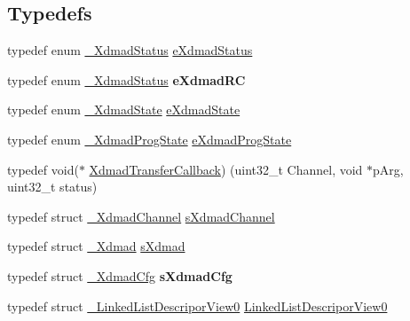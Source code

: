\subsection*{Typedefs}
\begin{DoxyCompactItemize}
\item 
typedef enum \mbox{\hyperlink{group__dmad__structs_gaec02ce64b667fbde91b1a90f4c61e3ca}{\+\_\+\+Xdmad\+Status}} \mbox{\hyperlink{group__dmad__structs_gae8f2d3dcc5f2bd3d05b76fd622eff70a}{e\+Xdmad\+Status}}
\item 
\mbox{\label{group__dmad__structs_ga843b6b8fc3ac9d6ce072d30c31ef07cd}} 
typedef enum \mbox{\hyperlink{group__dmad__structs_gaec02ce64b667fbde91b1a90f4c61e3ca}{\+\_\+\+Xdmad\+Status}} {\bfseries e\+Xdmad\+RC}
\item 
typedef enum \mbox{\hyperlink{group__dmad__structs_gab11875bdf8f31a2c76972640dcf13d89}{\+\_\+\+Xdmad\+State}} \mbox{\hyperlink{group__dmad__structs_ga82216e1cb5c7ed88c6e2d2e841a736fe}{e\+Xdmad\+State}}
\item 
typedef enum \mbox{\hyperlink{group__dmad__structs_gaea9ca6ac14cc448af9be1515bd2205c5}{\+\_\+\+Xdmad\+Prog\+State}} \mbox{\hyperlink{group__dmad__structs_gae5f8d9cd578ec745f050ebe575bc5753}{e\+Xdmad\+Prog\+State}}
\item 
typedef void($\ast$ \mbox{\hyperlink{group__dmad__structs_gaa36d3490b9c6967852605416acf658be}{Xdmad\+Transfer\+Callback}}) (uint32\+\_\+t Channel, void $\ast$p\+Arg, uint32\+\_\+t status)
\item 
typedef struct \mbox{\hyperlink{struct__XdmadChannel}{\+\_\+\+Xdmad\+Channel}} \mbox{\hyperlink{group__dmad__structs_ga822ea5147816d44b556f989a365c54b2}{s\+Xdmad\+Channel}}
\item 
typedef struct \mbox{\hyperlink{struct__Xdmad}{\+\_\+\+Xdmad}} \mbox{\hyperlink{group__dmad__structs_gaf2c13151514615a6beb35c0d868a5053}{s\+Xdmad}}
\item 
\mbox{\label{group__dmad__structs_ga5a584c8d554c8dc77af3d056da45f3c8}} 
typedef struct \mbox{\hyperlink{struct__XdmadCfg}{\+\_\+\+Xdmad\+Cfg}} {\bfseries s\+Xdmad\+Cfg}
\item 
\mbox{\label{group__dmad__structs_gaa6ecd4b62525e312f343d125a8fa5e6b}} 
typedef struct \mbox{\hyperlink{struct__LinkedListDescriporView0}{\+\_\+\+Linked\+List\+Descripor\+View0}} \mbox{\hyperlink{group__dmad__structs_gaa6ecd4b62525e312f343d125a8fa5e6b}{Linked\+List\+Descripor\+View0}}

\end{DoxyCompactItemize}
